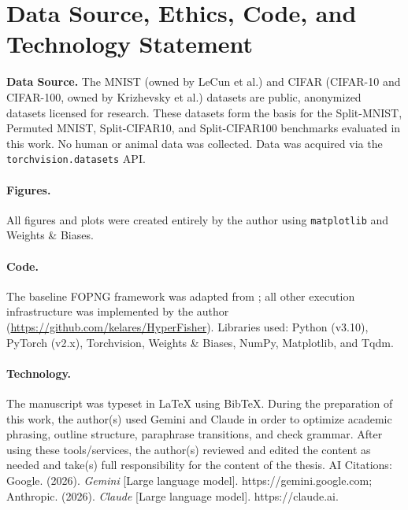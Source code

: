 \section{Data Source, Ethics, Code, and Technology Statement}
\label{sec:dsect}

\noindent\textbf{Data Source.} The MNIST (owned by LeCun et al.) and CIFAR (CIFAR-10 and CIFAR-100, owned by Krizhevsky et al.) datasets are public, anonymized datasets licensed for research. These datasets form the basis for the Split-MNIST, Permuted MNIST, Split-CIFAR10, and Split-CIFAR100 benchmarks evaluated in this work. No human or animal data was collected. Data was acquired via the \texttt{torchvision.datasets} API.

\paragraph{Figures.} All figures and plots were created entirely by the author using \texttt{matplotlib} and Weights \& Biases.

\paragraph{Code.} The baseline FOPNG framework was adapted from \citet{garg_fisher-orthogonal_2026}; all other execution infrastructure was implemented by the author (\url{https://github.com/kelares/HyperFisher}). Libraries used: Python (v3.10), PyTorch (v2.x), Torchvision, Weights \& Biases, NumPy, Matplotlib, and Tqdm.

\paragraph{Technology.} The manuscript was typeset in \LaTeX{} using BibTeX. During the preparation of this work, the author(s) used Gemini and Claude in order to optimize academic phrasing, outline structure, paraphrase transitions, and check grammar. After using these tools/services, the author(s) reviewed and edited the content as needed and take(s) full responsibility for the content of the thesis. AI Citations: Google. (2026). \textit{Gemini} [Large language model]. https://gemini.google.com; Anthropic. (2026). \textit{Claude} [Large language model]. https://claude.ai.